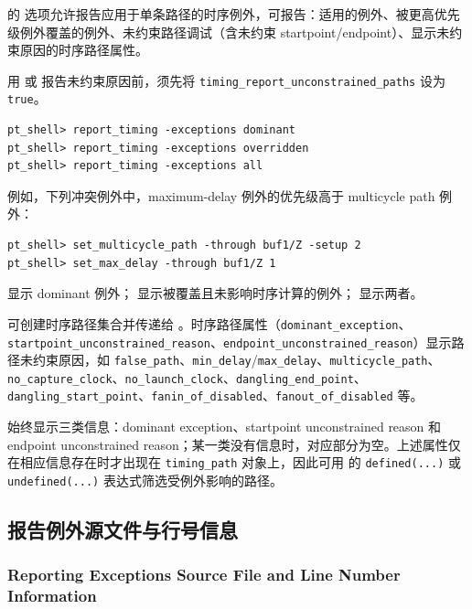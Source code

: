  的  选项允许报告应用于单条路径的时序例外，可报告：适用的例外、被更高优先级例外覆盖的例外、未约束路径调试（含未约束 startpoint/endpoint）、显示未约束原因的时序路径属性。

用  或  报告未约束原因前，须先将 \texttt{timing\_report\_unconstrained\_paths} 设为 \texttt{true}。

\begin{lstlisting}
pt_shell> report_timing -exceptions dominant
pt_shell> report_timing -exceptions overridden
pt_shell> report_timing -exceptions all
\end{lstlisting}

例如，下列冲突例外中，maximum-delay 例外的优先级高于 multicycle path 例外：
\begin{lstlisting}
pt_shell> set_multicycle_path -through buf1/Z -setup 2
pt_shell> set_max_delay -through buf1/Z 1
\end{lstlisting}

 显示 dominant 例外； 显示被覆盖且未影响时序计算的例外； 显示两者。

 可创建时序路径集合并传递给 。时序路径属性（\texttt{dominant\_exception}、\texttt{startpoint\_unconstrained\_reason}、\texttt{endpoint\_unconstrained\_reason}）显示路径未约束原因，如 \texttt{false\_path}、\texttt{min\_delay}/\texttt{max\_delay}、\texttt{multicycle\_path}、\texttt{no\_capture\_clock}、\texttt{no\_launch\_clock}、\texttt{dangling\_end\_point}、\texttt{dangling\_start\_point}、\texttt{fanin\_of\_disabled}、\texttt{fanout\_of\_disabled} 等。

 始终显示三类信息：dominant exception、startpoint unconstrained reason 和 endpoint unconstrained reason；某一类没有信息时，对应部分为空。上述属性仅在相应信息存在时才出现在 \texttt{timing\_path} 对象上，因此可用  的 \texttt{defined(...)} 或 \texttt{undefined(...)} 表达式筛选受例外影响的路径。

\subsection{报告例外源文件与行号信息}
\subsubsection*{Reporting Exceptions Source File and Line Number Information}


